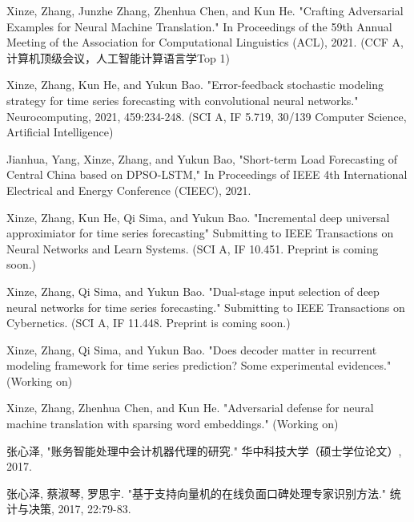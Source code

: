 
\begin{cventries}
    \vspace{-1.5mm}
    \cvpapers
    {
        \begin{cvitems}
            \item {Xinze, Zhang, Junzhe Zhang, Zhenhua Chen, and Kun He. "Crafting Adversarial Examples for Neural Machine Translation." In Proceedings of the 59th Annual Meeting of the Association for Computational Linguistics (ACL), 2021. (CCF A, 计算机顶级会议，人工智能计算语言学Top 1)}
            \item {Xinze, Zhang, Kun He, and Yukun Bao. "Error-feedback stochastic modeling strategy for time series forecasting with convolutional neural networks." Neurocomputing, 2021, 459:234-248. (SCI A, IF 5.719, 30/139 Computer Science, Artificial Intelligence)}
            \item {Jianhua, Yang, Xinze, Zhang, and Yukun Bao, "Short-term Load Forecasting of Central China based on DPSO-LSTM," In Proceedings of IEEE 4th International Electrical and Energy Conference (CIEEC), 2021.}
            \item {Xinze, Zhang, Kun He, Qi Sima, and Yukun Bao. "Incremental deep universal approximiator for time series forecasting" Submitting to IEEE Transactions on Neural Networks and Learn Systems. (SCI A, IF 10.451. Preprint is coming soon.)}
            \item {Xinze, Zhang, Qi Sima, and Yukun Bao. "Dual-stage input selection of deep neural networks for time series forecasting." Submitting to IEEE Transactions on Cybernetics. (SCI A, IF 11.448. Preprint is coming soon.)}
            \item {Xinze, Zhang, Qi Sima, and Yukun Bao. "Does decoder matter in recurrent modeling framework for time series prediction? Some experimental evidences." (Working on)}
            \item {Xinze, Zhang, Zhenhua Chen, and Kun He. "Adversarial defense for neural machine translation with sparsing word embeddings." (Working on)}
            \item {张心泽, "账务智能处理中会计机器代理的研究." 华中科技大学（硕士学位论文）, 2017.}
            \item {张心泽, 蔡淑琴, 罗思宇. "基于支持向量机的在线负面口碑处理专家识别方法." 统计与决策, 2017, 22:79-83.}
        \end{cvitems}
    }
\end{cventries}